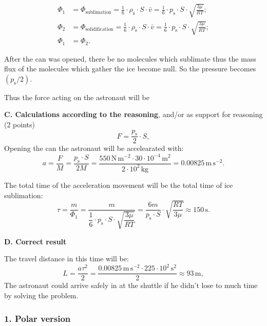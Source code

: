 \begin{align*}
  \Phi_1 &= \Phi_{\mathrm{sublimation}}
    = \frac{1}{6}\cdot\rho_{\mathrm{s}}\cdot S\cdot\bar{v}
    = \frac{1}{6}\cdot p_{\mathrm{s}}\cdot S\cdot\sqrt{\frac{3\mu}{RT}}; \\
  \Phi_2 &= \Phi_{\mathrm{solidification}}
    = \frac{1}{6}\cdot\rho_{\mathrm{s}}\cdot S\cdot\bar{v}
    = \frac{1}{6}\cdot p_{\mathrm{s}}\cdot S\cdot\sqrt{\frac{3\mu}{RT}}; \\
  \Phi_1 &= \Phi_2.
\end{align*}

After the can was opened, there be no molecules which sublimate thus the mass
flux of the molecules which gather the ice become null. So the pressure
becomes $\left(p_{\mathrm{s}}/2\right)$.

Thus the force acting on the astronaut will be

\textbf{C. Calculations according to the reasoning}, and/or as support for
reasoning \hfill(2 points)
\[ F = \frac{p_{\mathrm{s}}}{2}\cdot S, \]
Opening the can the astronaut will be accelearated %
with:
\[ a = \frac{F}{M} = \frac{p_{\mathrm{s}}\cdot S}{2M}
   = \frac{550\,\mathrm{N\,m^{-2}} \cdot 30\cdot10^{-4}\,\mathrm{m^2}}
          {2\cdot10^{2}\,\mathrm{kg}}
   = 0.00825\,\mathrm{m\,s^{-2}}. \]

The total time of the acceleration movement will be the total time of ice
sublimation:
\[ \tau = \frac{m}{\Phi_1}
   = \frac{m}{\dfrac{1}{6}\cdot p_{\mathrm{s}}\cdot S
     \cdot\sqrt{\dfrac{3\mu}{RT}}}
   = \frac{6m}{p_{\mathrm{s}}\cdot S}\cdot\sqrt{\frac{RT}{3\mu}}
   \approx 150\,\mathrm{s}. \]

\textbf{D. Correct result}

The travel distance in this time will be:
\[ L = \frac{a\tau^2}{2}
   = \frac{0.00825\,\mathrm{m\,s^{-2}} \cdot 225\cdot10^{2}\,\mathrm{s^2}}{2}
   \approx 93\,\mathrm{m}, \]
The astronaut could arrive safely in at the shuttle if he didn't lose to much
time by solving the problem. %

\subsubsection*{1. Polar version}

